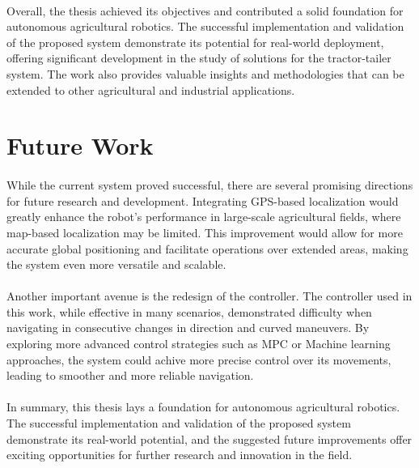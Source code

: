 \paragraph{}Overall, the thesis achieved its objectives and contributed a solid foundation for autonomous agricultural 
robotics. The successful implementation and validation of the proposed system demonstrate its potential for real-world 
deployment, offering significant development in the study of solutions for the tractor-tailer system. 
The work also provides valuable insights and methodologies that can be extended to other agricultural and 
industrial applications.


\section{Future Work}
\label{sec:future_work}
\paragraph{}While the current system proved successful, there are several promising directions 
for future research and development. Integrating GPS-based localization would greatly enhance 
the robot's performance in large-scale agricultural fields, where map-based localization 
may be limited. This improvement would allow for more accurate global positioning and 
facilitate operations over extended areas, making the system even more versatile and scalable.

\paragraph{}Another important avenue is the redesign of the controller. The controller used 
in this work, while effective in many scenarios, demonstrated difficulty when navigating in consecutive 
changes in direction and curved maneuvers. By exploring more advanced control strategies 
such as \gls{MPC} or Machine learning approaches, the system could achive more precise 
control over its movements, leading to smoother and more reliable navigation.

\paragraph{}In summary, this thesis lays a foundation for autonomous 
agricultural robotics. The successful implementation and validation of the proposed 
system demonstrate its real-world potential, and the suggested future improvements offer 
exciting opportunities for further research and innovation in the field.

